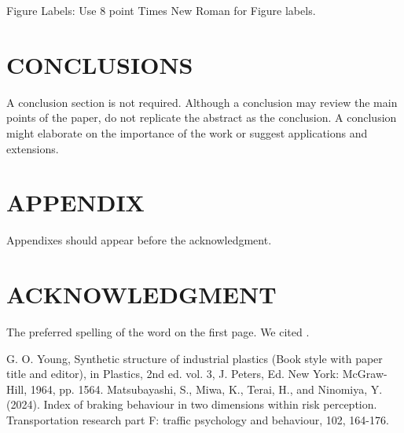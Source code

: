\documentclass[letterpaper, 10 pt, conference]{ieeeconf}  %
\begin{document}
Figure Labels: Use 8 point Times New Roman for Figure labels. 

\section{CONCLUSIONS}

A conclusion section is not required. Although a conclusion may review the main points of the paper, do not replicate the abstract as the conclusion. A conclusion might elaborate on the importance of the work or suggest applications and extensions. 

\addtolength{\textheight}{-12cm}  

\section*{APPENDIX}

Appendixes should appear before the acknowledgment.

\section*{ACKNOWLEDGMENT}

The preferred spelling of the word on the first page. We cited \cite{c2}.


\begin{thebibliography}{99}

 G. O. Young, Synthetic structure of industrial plastics (Book style with paper title and editor), in Plastics, 2nd ed. vol. 3, J. Peters, Ed.  New York: McGraw-Hill, 1964, pp. 1564.
 Matsubayashi, S., Miwa, K., Terai, H., and Ninomiya, Y. (2024). Index of braking behaviour in two dimensions within risk perception. Transportation research part F: traffic psychology and behaviour, 102, 164-176.

\end{thebibliography}
\end{document}
